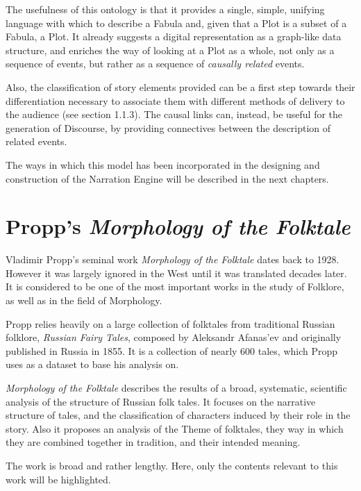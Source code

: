 \documentclass[12pt,a4paper,oneside]{report}
\begin{document}
The usefulness of this ontology is that it provides a single, simple, unifying language with which to describe a Fabula and, given that a Plot is a subset of a Fabula,  a Plot. It already suggests a digital representation as a graph-like data structure, and enriches the way of looking at a Plot as a whole, not only as a sequence of events, but rather as a sequence of \textit{causally related} events.

Also, the classification of story elements provided can be a first step towards their differentiation necessary to associate them with different methods of delivery to the audience (see section 1.1.3). The causal links can, instead, be useful for the generation of Discourse, by providing connectives between the description of related events.

The ways in which this model has been incorporated in the designing and construction of the Narration Engine will be described in the next chapters.

\pagebreak

\section{Propp's \textit{Morphology of the Folktale}}
Vladimir Propp's seminal work \textit{Morphology of the Folktale} \cite{propp} dates back to 1928. However it was largely ignored in the West until it was translated decades later. It is considered to be one of the most important works in the study of Folklore, as well as in the field of Morphology. 

Propp relies heavily on a large collection of folktales from traditional Russian folklore, \textit{Russian Fairy Tales}, composed by Aleksandr Afanas'ev and originally published in Russia in 1855. It is a collection of nearly 600 tales, which Propp uses as a dataset to base his analysis on.

\textit{Morphology of the Folktale} describes the results of a broad, systematic, scientific analysis of the structure of Russian folk tales. It focuses on the narrative structure of tales, and the classification of characters induced by their role in the story. Also it proposes an analysis of the Theme of folktales, they way in which they are combined together in tradition, and their intended meaning.

The work is broad and rather lengthy. Here, only the contents relevant to this work will be highlighted.

\bigskip
\end{document}
